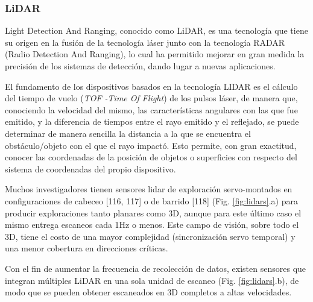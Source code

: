 \subsubsection{LiDAR}
Light Detection And Ranging, conocido como LiDAR, es una tecnología que tiene su origen en la fusión de la tecnología láser junto con la tecnología RADAR (Radio Detection And Ranging), lo cual ha permitido mejorar en gran medida la precisión de los sistemas de detección,  dando lugar a nuevas aplicaciones. 

El  fundamento de los dispositivos basados en la tecnología LIDAR es el cálculo del tiempo de vuelo (\textit{TOF -Time  Of Flight}) de los pulsos láser, de manera que, conociendo la velocidad del mismo, las características angulares con las que fue emitido, y la diferencia de tiempos entre el rayo emitido y el reflejado, se puede determinar de manera sencilla la distancia a la que se encuentra el obstáculo/objeto con el que el rayo impactó. Esto permite, con gran exactitud, conocer las coordenadas de la posición de objetos o superficies con respecto del sistema de coordenadas del propio dispositivo.

Muchos investigadores tienen sensores lidar de exploración servo-montados en configuraciones de cabeceo [116, 117] o de barrido [118] (Fig. \ref{fig:lidars}.a) para producir exploraciones tanto planares como 3D, aunque para este último caso el mismo entrega escaneos cada 1Hz o menos. Este campo de visión, sobre todo el 3D, tiene el costo de una mayor complejidad (sincronización servo temporal) y una menor cobertura en direcciones críticas.

\begin{large}
[pfingsthron2012][newman2006][bosse2009]
\end{large}

Con el fin de aumentar la frecuencia de recolección de datos, existen sensores que integran múltiples LiDAR en una sola unidad de escaneo (Fig. \ref{fig:lidars}.b), de modo que se pueden obtener escaneados en 3D completos a altas velocidades.

